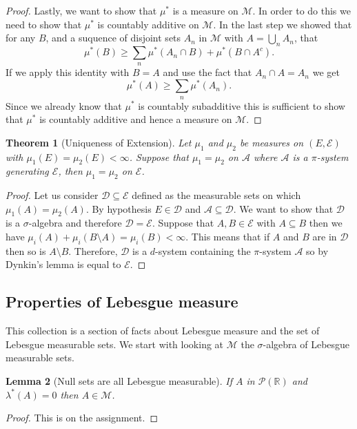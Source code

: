 \documentclass[11pt]{article}
\newtheorem{thm}{Theorem}[section]
\newtheorem{lem}[thm]{Lemma}
\theoremstyle{definition}
\theoremstyle{remark}
\begin{document}
\begin{proof}
Lastly, we want to show that $\mu^*$ is a measure on $\mathscr{M}$. In order to do this we need to show that $\mu^*$ is countably additive on $\mathscr{M}$. In the last step we showed that for any $B$, and a suquence of disjoint sets $A_n$ in $\mathscr{M}$ with $A= \bigcup_n A_n$, that
\[ \mu^*(B) \geq \sum_n \mu^*(A_n \cap B) + \mu^*(B \cap A^c). \] If we apply this identity with $B=A$ and use the fact that $A_n \cap A = A_n$ we get
\[ \mu^*(A) \geq \sum_n \mu^*(A_n). \] Since we already know that $\mu^*$ is countably subadditive this is sufficient to show that $\mu^*$ is countably additive and hence a measure on $\mathscr{M}$.
\end{proof}

\begin{thm}[Uniqueness of Extension]
Let $\mu_1$ and $\mu_2$ be measures on $(E,\mathcal{E})$ with $\mu_1(E) = \mu_2(E) < \infty$. Suppose that $\mu_1 = \mu_2$ on $\mathcal{A}$ where $\mathcal{A}$ is a $\pi$-system generating $\mathcal{E}$, then $\mu_1 = \mu_2$ on $\mathcal{E}$.
\end{thm}
\begin{proof}
Let us consider $\mathcal{D} \subseteq \mathcal{E}$ defined as the measurable sets on which $\mu_1(A) = \mu_2(A)$. By hypothesis $E \in \mathcal{D}$ and $\mathcal{A} \subseteq \mathcal{D}$. We want to show that $\mathcal{D}$ is a $\sigma$-algebra and therefore $\mathcal{D} = \mathcal{E}$. Suppose that $A, B \in \mathcal{E}$ with $A \subseteq B$ then we have $\mu_i(A) + \mu_i (B \setminus A) = \mu_i(B) < \infty.$ This means that if $A$ and $B$ are in $\mathcal{D}$ then so is $A \setminus B$. Therefore, $\mathcal{D}$ is a $d$-system containing the $\pi$-system $\mathcal{A}$ so by Dynkin's lemma is equal to $\mathcal{E}$.
\end{proof}

\subsection{Properties of Lebesgue measure}
This collection is a section of facts about Lebesgue measure and the set of Lebesgue measurable sets. We start with looking at $\mathscr{M}$ the $\sigma$-algebra of Lebesgue measurable sets. 

\begin{lem}[Null sets are all Lebesgue measurable]
If $A$ in $\mathscr{P}(\mathbb{R})$ and $\lambda^*(A) =0$ then $A \in \mathscr{M}$.
\end{lem}
\begin{proof}
This is on the assignment. 
\end{proof}
\end{document}
